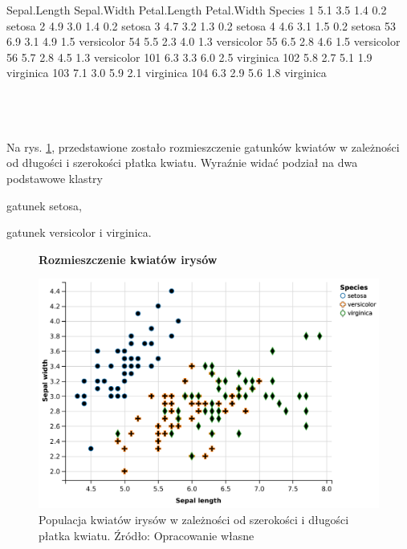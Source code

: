 \begin{code}[caption=Przykład danych o kwiatach irysów, label={lst:danekwiatow}, captionpos=b, 
belowcaptionskip=4pt]
    Sepal.Length Sepal.Width Petal.Length Petal.Width    Species
1            5.1         3.5          1.4         0.2     setosa
2            4.9         3.0          1.4         0.2     setosa
3            4.7         3.2          1.3         0.2     setosa
4            4.6         3.1          1.5         0.2     setosa
53           6.9         3.1          4.9         1.5 versicolor
54           5.5         2.3          4.0         1.3 versicolor
55           6.5         2.8          4.6         1.5 versicolor
56           5.7         2.8          4.5         1.3 versicolor
101          6.3         3.3          6.0         2.5  virginica
102          5.8         2.7          5.1         1.9  virginica
103          7.1         3.0          5.9         2.1  virginica
104          6.3         2.9          5.6         1.8  virginica
\end{code}
\\\\\\
Na rys. \ref{fig:plotsepalwidthsepallength}, przedstawione zostało rozmieszczenie gatunków kwiatów w zależności od 
długości i szerokości płatka kwiatu. Wyraźnie widać podział na dwa podstawowe klastry
\begin{itemize*} 
\renewcommand{\labelitemi}{$\bullet$}
 \item gatunek setosa,
 \item gatunek versicolor i virginica.
\end{itemize*}

\begin{figure}[h]
    \centering
    \textbf{Rozmieszczenie kwiatów irysów}\par\medskip
    \includegraphics[scale=0.5]{plotsepalwidthsepallength}
    \caption{Populacja kwiatów irysów w zależności od szerokości i długości płatka kwiatu. Źródło: Opracowanie własne}
    \label{fig:plotsepalwidthsepallength}
\end{figure}

